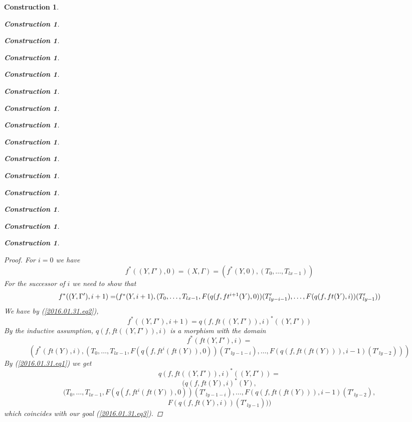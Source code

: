 \documentclass[12pt]{amsart}
\newenvironment{eq}{\begin{equation}}{\end{equation}}
\newtheorem{lemma}[proposition]{Lemma}
\newtheorem{construction}[proposition]{Construction}
\newcommand{\llabel}[1]{\label{#1}}
\renewcommand{\comment}[1]{}
\newcommand{\sr}{\rightarrow}
\begin{document}
\begin{construction}
\begin{construction}
\begin{construction}
\begin{construction}
\begin{construction}
\begin{construction}
\begin{construction}
\begin{construction}
\begin{construction}
\begin{construction}
\begin{construction}
\begin{construction}
\begin{construction}
\begin{construction}
\begin{construction}
\begin{proof}
For $i=0$ we have 
%
$$f^*((Y,\Gamma'),0)=(X,\Gamma)=(f^*(Y,0),(T_0,\dots,T_{lx-1}))$$
%
For the successor of $i$ we need to show that
%
\begin{eq}\llabel{2016.01.31.eq3}
f^*((Y,\Gamma'),i+1)=$$$$(f^*(Y,i+1),(T_0,\dots,T_{lx-1},F(q(f,ft^{i+1}(Y),0))(T'_{ly-i-1}),\dots,F(q(f,ft(Y),i))(T'_{ly-1}))
\end{eq}%
%
We have by (\ref{2016.01.31.eq2}),  
%
$$f^*((Y,\Gamma'),i+1)=q(f,ft((Y,\Gamma')),i)^*((Y,\Gamma'))$$
%
By the inductive assumption, $q(f,ft((Y,\Gamma')),i)$ is a morphism with the domain
%
$$f^*(ft(Y,\Gamma'),i)=$$$$(f^*(ft(Y),i),(T_0,\dots,T_{lx-1},F(q(f,ft^{i}(ft(Y)),0))(T'_{ly-1-i}),\dots,F(q(f,ft(ft(Y))),i-1)(T'_{ly-2})))$$
%
By (\ref{2016.01.31.eq1}) we get
%
$$q(f,ft((Y,\Gamma')),i)^*((Y,\Gamma'))=$$
$$(q(f,ft(Y),i)^*(Y),$$
$$(T_0,\dots,T_{lx-1},F(q(f,ft^{i}(ft(Y)),0))(T'_{ly-1-i}),\dots,F(q(f,ft(ft(Y))),i-1)(T'_{ly-2}), $$$$F(q(f,ft(Y),i))(T'_{ly-1})))$$
%
which coincides with our goal (\ref{2016.01.31.eq3}). 
\end{proof}
%

\comment{
\begin{lemma}
\llabel{2015.08.26.l7} 
Let $(Y,\Gamma')\ge (W,\Delta)$, where
$\Gamma'=(T'_0,\dots,T'_{l(Y)-1})$ and let $f:(X,\Gamma)\sr (W,\Delta)$ be a
morphism where $\Gamma=(T_0,\dots,T_{l(X)-1})$. Then one has
%
$$f^*((Y,\Gamma'))=(f^*(Y),(T_0,\dots,T_{l(X)-1},F(q(f,ft^{n'-n}(Y)))(T'_n),\dots,F(q(f,Y))(T'_{n'-1})))$$
%
\end{lemma}
%
\begin{proof}
Let $n=l(W)$ and let $i=n'-n$. Then $(W,\Delta)=ft^i((Y,\Gamma'))$, i.e.,
$W=ft^i(Y)$, $\Delta=(T'_0,\dots,T'_{n-1})$ and
$\Gamma'=(T'_0,\dots,T'_{n-1+i})$. By definition
$f^*((Y,\Gamma'))=f^*((Y,\Gamma'),i)$.

The proof is by induction on $i$ after replacing $n'$ with $n+i$. 

For $i=0$ we have $f^*((Y,\Gamma'),0)=(X,\Gamma)$.


\end{proof}}
\end{construction}
\end{construction}
\end{construction}
\end{construction}
\end{construction}
\end{construction}
\end{construction}
\end{construction}
\end{construction}
\end{construction}
\end{construction}
\end{construction}
\end{construction}
\end{construction}
\end{construction}
\end{document}
